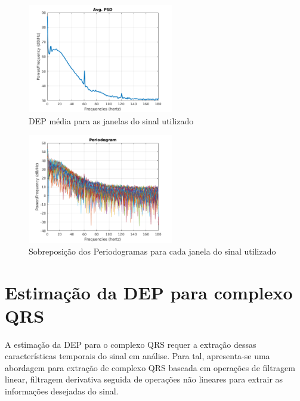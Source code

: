 \documentclass{article}
\begin{document}
\begin{figure}[H]
	\begin{center}
		\includegraphics[width=2.5in]{Figures/avg_psd.png}
		\caption{DEP média para as janelas do sinal utilizado}
		\label{fig:1avg}
	\end{center}
\end{figure}

\begin{figure}[H]
	\begin{center}
		\includegraphics[width=2.5in]{Figures/periodogram_all.png}
		\caption{Sobreposição dos Periodogramas para cada janela do sinal utilizado}
		\label{fig:1all}
	\end{center}
\end{figure}

\section{Estimação da DEP para complexo QRS}
A estimação da DEP para o complexo QRS requer a extração dessas características temporais do sinal em análise. Para tal, apresenta-se uma abordagem para extração de complexo QRS baseada em operações de filtragem linear, filtragem derivativa seguida de operações não lineares para extrair as informações desejadas do sinal.
\end{document}
